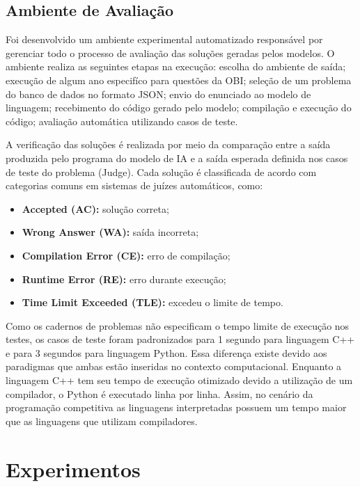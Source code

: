 \documentclass[12pt]{article}
\begin{document}
\subsection{Ambiente de Avaliação}

Foi desenvolvido um ambiente experimental automatizado responsável por gerenciar todo o processo de avaliação das soluções geradas \cite{obibenchmarking2026} pelos modelos. O ambiente realiza as seguintes etapas na execução: escolha do ambiente de saída; execução de algum ano especifíco para questões da OBI; seleção de um problema do banco de dados no formato JSON; envio do enunciado ao modelo de linguagem; recebimento do código gerado pelo modelo; compilação e execução do código; avaliação automática utilizando casos de teste.

A verificação das soluções é realizada por meio da comparação entre a saída produzida pelo programa do modelo de IA e a saída esperada definida nos casos de teste do problema (Judge). Cada solução é classificada de acordo com categorias comuns em sistemas de juízes automáticos, como:

\begin{itemize}
    \item \textbf{Accepted (AC):} solução correta;
    \item \textbf{Wrong Answer (WA):} saída incorreta;
    \item \textbf{Compilation Error (CE):} erro de compilação;
    \item \textbf{Runtime Error (RE):} erro durante execução;
    \item \textbf{Time Limit Exceeded (TLE):} excedeu o limite de tempo.
\end{itemize}

Como os cadernos de problemas não especificam o tempo limite de execução nos testes, os casos de teste foram padronizados para 1 segundo para linguagem C++ e para 3 segundos para linguagem Python. Essa diferença existe devido aos paradigmas que ambas estão inseridas no contexto computacional. Enquanto a linguagem C++ tem seu tempo de execução otimizado devido a utilização de um compilador, o Python é executado linha por linha. Assim, no cenário da programação competitiva as linguagens interpretadas possuem um tempo maior que as linguagens que utilizam compiladores.

\section{Experimentos}
\end{document}
